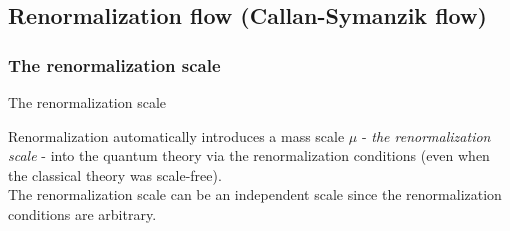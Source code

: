  


\subsection{Renormalization flow (Callan-Symanzik flow)}
\subsubsection{The renormalization scale}
\begin{mybox}{The renormalization scale}
	
	Renormalization automatically introduces a mass scale $\mu$ - \emph{the renormalization scale} - into the quantum theory via the renormalization conditions (even when the classical theory was scale-free).\\
	The renormalization scale can be an independent scale since the renormalization conditions are arbitrary.
\end{mybox}

